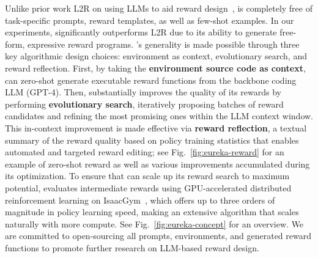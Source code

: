   

Unlike prior work L2R on using LLMs to aid reward design~\citep{yu2023language}, \ourmethod is completely free of task-specific prompts, reward templates, as well as few-shot examples. In our experiments, \ourmethod significantly outperforms L2R due to its ability to generate free-form, expressive reward programs. \ourmethod's generality is made possible through three key algorithmic design choices: environment as context, evolutionary search, and reward reflection. First, by taking the \textbf{environment source code as context}, \ourmethod can zero-shot generate executable reward functions from the backbone coding LLM (GPT-4). Then, \ourmethod substantially improves the quality of its rewards by performing \textbf{evolutionary search}, iteratively proposing batches of reward candidates and refining the most promising ones within the LLM context window. This in-context improvement is made effective via \textbf{reward reflection}, a textual summary of the reward quality based on policy training statistics that enables automated and targeted reward editing; see Fig.~\ref{fig:eureka-reward} for an example of \ourmethod zero-shot reward as well as various improvements accumulated during its optimization. To ensure that \ourmethod can scale up its reward search to maximum potential, \ourmethod evaluates intermediate rewards using GPU-accelerated distributed reinforcement learning on IsaacGym~\citep{makoviychuk2021isaac}, which offers up to three orders of magnitude in policy learning speed, making \ourmethod an extensive algorithm that scales naturally with more compute. See Fig.~\ref{fig:eureka-concept} for an overview. We are committed to open-sourcing all prompts, environments, and generated reward functions to promote further research on LLM-based reward design.





























